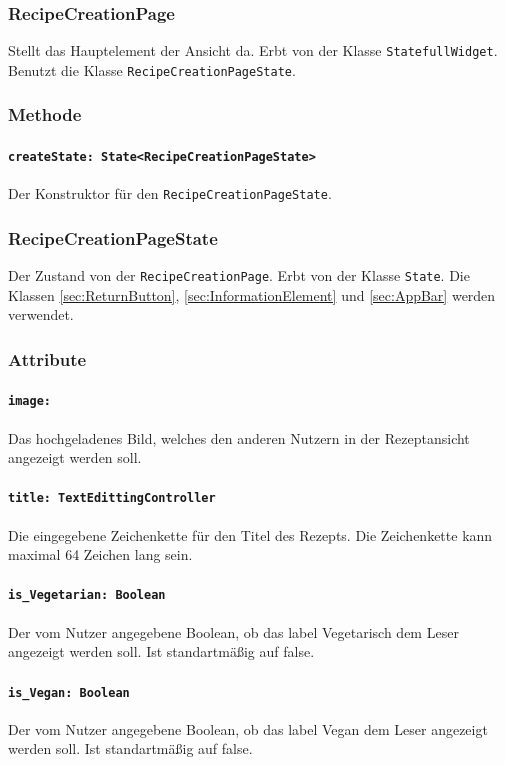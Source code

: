 \documentclass{entwurfsheft}
\begin{document}
    \subsubsection{RecipeCreationPage}
        Stellt das Hauptelement der Ansicht da. Erbt von der Klasse \texttt{StatefullWidget}. Benutzt die Klasse \texttt{RecipeCreationPageState}.
        \subsubsection*{Methode}
            \paragraph*{\texttt{createState: State<RecipeCreationPageState>}} Der Konstruktor für den \texttt{RecipeCreationPageState}.

    \subsubsection{RecipeCreationPageState}
        Der Zustand von der \texttt{RecipeCreationPage}. Erbt von der Klasse \texttt{State}. Die Klassen \ref{sec:ReturnButton}, \ref{sec:InformationElement} und \ref{sec:AppBar} werden verwendet.
        \subsubsection*{Attribute}
            \paragraph*{\texttt{image: }} Das hochgeladenes Bild, welches den anderen Nutzern in der Rezeptansicht angezeigt werden soll.
            \paragraph*{\texttt{title: TextEdittingController}} Die eingegebene Zeichenkette für den Titel des Rezepts. Die Zeichenkette kann maximal 64 Zeichen lang sein.
            \paragraph*{\texttt{is\_Vegetarian: Boolean}} Der vom Nutzer angegebene Boolean, ob das \gls{label} Vegetarisch dem Leser angezeigt werden soll. Ist standartmäßig auf false.
            \paragraph*{\texttt{is\_Vegan: Boolean}} Der vom Nutzer angegebene Boolean, ob das \gls{label} Vegan dem Leser angezeigt werden soll. Ist standartmäßig auf false.
\end{document}
